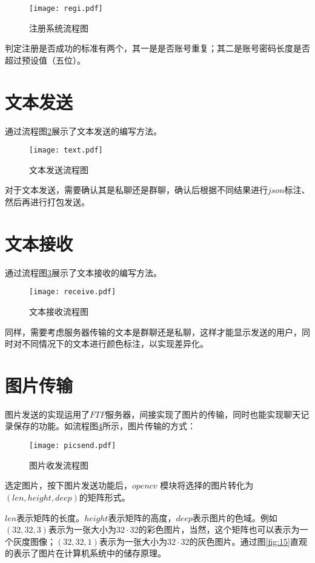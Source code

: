 \documentclass[forprint]{sql}
\begin{document}
\begin{figure}[!htbp]
	\centering
	\texttt{[image: regi.pdf]}
	\caption{注册系统流程图}
	\label{fig:7}
\end{figure}

判定注册是否成功的标准有两个，其一是是否账号重复；其二是账号密码长度是否超过预设值（五位）。

\section{文本发送}

通过流程图\ref{fig:8}展示了文本发送的编写方法。

\begin{figure}[!htbp]
	\centering
	\texttt{[image: text.pdf]}
	\caption{文本发送流程图}
	\label{fig:8}
\end{figure}

对于文本发送，需要确认其是私聊还是群聊，确认后根据不同结果进行$ json $标注、然后再进行打包发送。

\section{文本接收}

通过流程图\ref{fig:9}展示了文本接收的编写方法。

\begin{figure}[!htbp]
	\centering
	\texttt{[image: receive.pdf]}
	\caption{文本接收流程图}
	\label{fig:9}
\end{figure}

同样，需要考虑服务器传输的文本是群聊还是私聊，这样才能显示发送的用户，同时对不同情况下的文本进行颜色标注，以实现差异化。

\section{图片传输}
图片发送的实现运用了$FTP$服务器，间接实现了图片的传输，同时也能实现聊天记录保存的功能。如流程图\ref{fig:11}所示，图片传输的方式：

\begin{figure}[!htbp]
	\centering
	\texttt{[image: picsend.pdf]}
	\caption{图片收发流程图}
	\label{fig:11}
\end{figure}

选定图片，按下图片发送功能后，$opencv$ 模块将选择的图片转化为$(len,height,deep)$的矩阵形式。

$len$表示矩阵的长度。$height$表示矩阵的高度，$deep$表示图片的色域。例如$(32,32,3)$表示为一张大小为$32 \cdot 32$的彩色图片，当然，这个矩阵也可以表示为一个灰度图像；$(32,32,1)$表示为一张大小为$32 \cdot 32$的灰色图片。通过图\ref{fig:15}直观的表示了图片在计算机系统中的储存原理。
\end{document}
